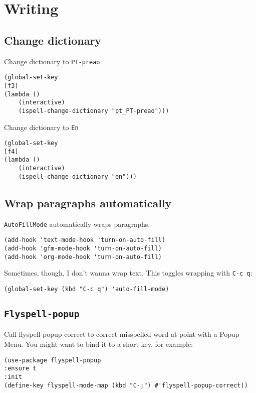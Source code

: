 \documentclass[11pt]{article}
\begin{document}
\section{Writing}
\label{sec:org2fc4c0f}
\subsection{Change dictionary}
\label{sec:orga322c04}

Change dictionary to \texttt{PT-preao}

\begin{verbatim}
(global-set-key
[f3]
(lambda ()
    (interactive)
    (ispell-change-dictionary "pt_PT-preao")))
\end{verbatim}

Change dictionary to \texttt{En}

\begin{verbatim}
(global-set-key
[f4]
(lambda ()
    (interactive)
    (ispell-change-dictionary "en")))
\end{verbatim}
\subsection{Wrap paragraphs automatically}
\label{sec:org62968ca}

\texttt{AutoFillMode} automatically wraps paragraphs.

\begin{verbatim}
(add-hook 'text-mode-hook 'turn-on-auto-fill)
(add-hook 'gfm-mode-hook 'turn-on-auto-fill)
(add-hook 'org-mode-hook 'turn-on-auto-fill)
\end{verbatim}

Sometimes, though, I don’t wanna wrap text. This toggles wrapping with \texttt{C-c q}:

\begin{verbatim}
(global-set-key (kbd "C-c q") 'auto-fill-mode)
\end{verbatim}
\subsection{\texttt{Flyspell-popup}}
\label{sec:orga1a59e5}

Call flyspell-popup-correct to correct misspelled word at point with a Popup
Menu. You might want to bind it to a short key, for example:

\begin{verbatim}
(use-package flyspell-popup
:ensure t
:init
(define-key flyspell-mode-map (kbd "C-;") #'flyspell-popup-correct))
\end{verbatim}
\end{document}
